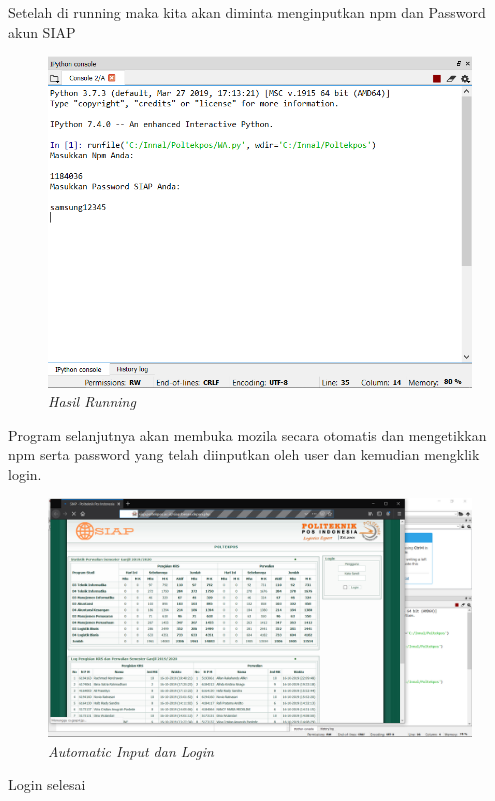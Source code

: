 Setelah di running maka kita akan diminta menginputkan npm dan Password akun SIAP
\begin{figure}[H]
    \centering
    \includegraphics[scale=0.5]{figures/running}
    \caption{\textit{Hasil Running}}
    \label{Automatic2}
\end{figure}
Program selanjutnya akan membuka mozila secara otomatis dan mengetikkan npm serta password yang telah diinputkan oleh user dan kemudian mengklik login.
\begin{figure}[H]
    \centering
    \includegraphics[scale=0.2]{figures/isi}
    \caption{\textit{Automatic Input dan Login}}
    \label{Automatic3}
\end{figure}
Login selesai
